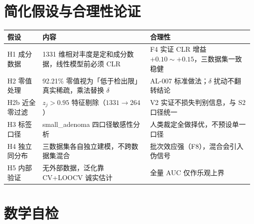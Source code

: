 \documentclass{internal-report}
\begin{document}
\section{简化假设与合理性论证}

\begin{center}
\footnotesize
\begin{tabular}{p{3.2cm}p{5.2cm}p{5.0cm}}
\toprule
假设 & 内容 & 合理性 \\
\midrule
H1 成分数据 & 1331 维相对丰度是定和成分数据，线性模型前必须 CLR & F4 实证 CLR 增益 $+0.10\sim+0.15$，三数据集一致稳健 \\
H2 零值处理 & 92.21\% 零值视为「低于检出限」真实稀疏，乘法替换 $\delta$ & AL-007 标准做法；$\delta$ 扰动不翻转结论 \\
H2b 近全零过滤 & $z_j>0.95$ 特征剔除（$1331\to264$） & V2 实证不损失判别信息，与 S2 口径统一 \\
H3 标签口径 & small\_adenoma 四口径敏感性分析 & 人类裁定全做择优，不预设单一口径 \\
H4 独立同分布 & 三数据集各自独立建模，不跨数据集混合 & 批次效应强（F8），混合会引入伪信号 \\
H5 内部验证 & 无外部数据，泛化靠 CV+LOOCV 诚实估计 & 全量 AUC 仅作乐观上界 \\
\bottomrule
\end{tabular}
\end{center}

\section{数学自检}
\end{document}
